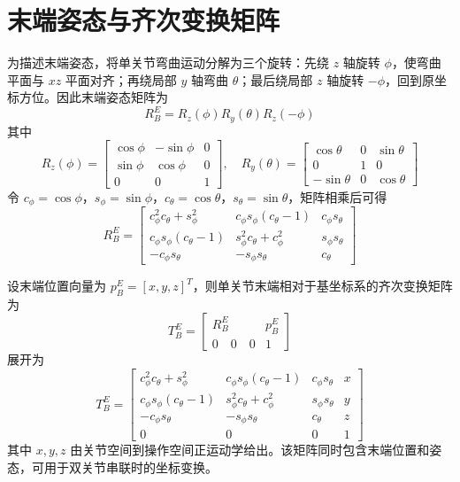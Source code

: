 \documentclass[UTF8,zihao=-4,oneside]{ctexrep}
\begin{document}
\section{末端姿态与齐次变换矩阵}

为描述末端姿态，将单关节弯曲运动分解为三个旋转：先绕 \(z\) 轴旋转 \(\phi\)，使弯曲平面与 \(xz\) 平面对齐；再绕局部 \(y\) 轴弯曲 \(\theta\)；最后绕局部 \(z\) 轴旋转 \(-\phi\)，回到原坐标方位。因此末端姿态矩阵为
\begin{equation}
  R_B^E = R_z(\phi)R_y(\theta)R_z(-\phi)
\end{equation}
其中
\begin{equation}
  R_z(\phi)=
  \begin{bmatrix}
    \cos\phi & -\sin\phi & 0\\
    \sin\phi & \cos\phi & 0\\
    0 & 0 & 1
  \end{bmatrix},
  \quad
  R_y(\theta)=
  \begin{bmatrix}
    \cos\theta & 0 & \sin\theta\\
    0 & 1 & 0\\
    -\sin\theta & 0 & \cos\theta
  \end{bmatrix}
\end{equation}
令 \(c_\phi=\cos\phi\)，\(s_\phi=\sin\phi\)，\(c_\theta=\cos\theta\)，\(s_\theta=\sin\theta\)，矩阵相乘后可得
\begin{equation}
  R_B^E =
  \begin{bmatrix}
    c_\phi^2c_\theta+s_\phi^2 & c_\phi s_\phi(c_\theta-1) & c_\phi s_\theta\\
    c_\phi s_\phi(c_\theta-1) & s_\phi^2c_\theta+c_\phi^2 & s_\phi s_\theta\\
    -c_\phi s_\theta & -s_\phi s_\theta & c_\theta
  \end{bmatrix}
\end{equation}

设末端位置向量为 \(p_B^E=[x,y,z]^T\)，则单关节末端相对于基坐标系的齐次变换矩阵为
\begin{equation}
  T_B^E =
  \begin{bmatrix}
    R_B^E & p_B^E\\
    0\quad 0\quad 0 & 1
  \end{bmatrix}
\end{equation}
展开为
\begin{equation}
  T_B^E =
  \begin{bmatrix}
    c_\phi^2c_\theta+s_\phi^2 & c_\phi s_\phi(c_\theta-1) & c_\phi s_\theta & x\\
    c_\phi s_\phi(c_\theta-1) & s_\phi^2c_\theta+c_\phi^2 & s_\phi s_\theta & y\\
    -c_\phi s_\theta & -s_\phi s_\theta & c_\theta & z\\
    0 & 0 & 0 & 1
  \end{bmatrix}
\end{equation}
其中 \(x,y,z\) 由关节空间到操作空间正运动学给出。该矩阵同时包含末端位置和姿态，可用于双关节串联时的坐标变换。
\end{document}
